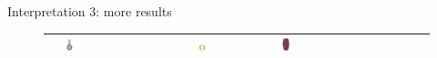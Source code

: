 \documentclass[10pt]{beamer}
\begin{document}
\begin{frame}{Interpretation 3: more results}
\begin{figure}
\begin{tabular}{c|*{4}{l}}
& \includegraphics[width=0.1\textwidth]{interp/synth_interp/vase0_ps}
& \includegraphics[width=0.1\textwidth]{interp/synth_interp/barrel_sl}
& \includegraphics[width=0.1\textwidth]{interp/synth_interp/vase1_mvs} \\
\bottomrule
\end{tabular}
\end{figure}

\end{frame}
\end{document}
